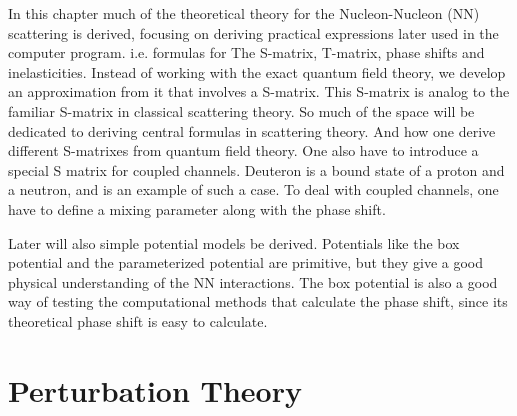 \label{chap:scattering}

In this chapter much of the theoretical theory for the Nucleon-Nucleon (NN) scattering is derived, 
focusing on deriving practical expressions later used in the computer program. i.e. 
formulas for The S-matrix, T-matrix, phase shifts and inelasticities.
Instead of working with the exact quantum field theory, we develop an approximation from it that involves a S-matrix.
This S-matrix is analog to the familiar S-matrix in classical scattering theory.
So much of the space will be dedicated to deriving central formulas in scattering theory.
And how one derive different S-matrixes from quantum field theory.
One also have to introduce a special S matrix for coupled channels. Deuteron is a bound state of a
proton and a neutron, 
and is an example of such a case. To deal with coupled channels, one have to 
define a mixing parameter along with the phase shift.

Later will also simple potential models be derived. Potentials like the box potential and the parameterized
potential are primitive, but they give a good physical understanding of the NN interactions. The box potential
is also a good way of testing the computational methods that calculate the phase shift, 
since its theoretical phase shift is easy to calculate.



\section{Perturbation Theory} 

